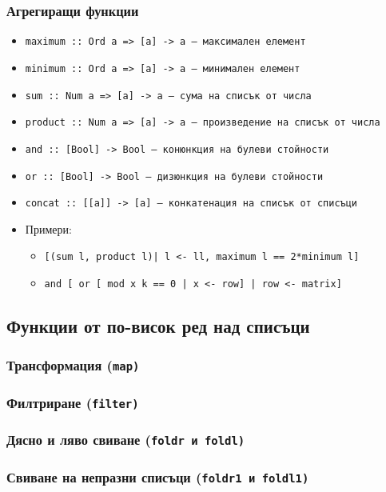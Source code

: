\documentclass{beamer}
\begin{document}
\begin{frame}[fragile]
  \frametitle{Агрегиращи функции}
  \small
  \begin{itemize}
  \item \tt{maximum :: Ord a => [a] -> a} --- максимален елемент
  \item \tt{minimum :: Ord a => [a] -> a} --- минимален елемент
  \item \tt{sum :: Num a => [a] -> a} --- сума на списък от числа
  \item \tt{product :: Num a => [a] -> a} --- произведение на списък от числа
  \item \tt{and :: [Bool] -> Bool} --- конюнкция на булеви стойности
  \item \tt{or :: [Bool] -> Bool} --- дизюнкция на булеви стойности
  \item \tt{concat :: [[a]] -> [a]} --- конкатенация на списък от списъци
  \pause
  \item Примери:
    \begin{itemize}[<+->]
    \item \verb#[(sum l, product l)| l <- ll, maximum l == 2*minimum l]#
    \item \verb#and [ or [ mod x k == 0 | x <- row] | row <- matrix]#
    \end{itemize}
  \end{itemize}
\end{frame}

\subsection{Функции от по-висок ред над списъци}

\begin{frame}
  \frametitle{Трансформация (\tt{map})}

\end{frame}

\begin{frame}
  \frametitle{Филтриране (\tt{filter})}

\end{frame}

\begin{frame}
  \frametitle{Дясно и ляво свиване (\tt{foldr} и \tt{foldl})}

\end{frame}

\begin{frame}
  \frametitle{Свиване на непразни списъци (\tt{foldr1} и \tt{foldl1})}

\end{frame}
\end{document}
